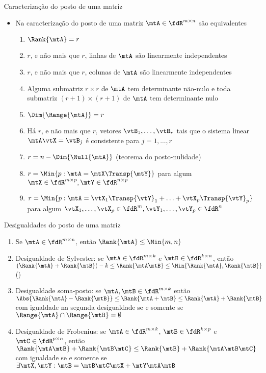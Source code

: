 \begin{frame}{Caracterização do posto de uma matriz~\cite{Horn2012}}
  \begin{itemize}
    \item Na caracterização do posto de uma matriz $ \mtA \in \fdR^{m \times n} $ são equivalentes
    \begin{enumerate}\addtolength{\itemsep}{0.5\baselineskip}
      \item $ \Rank{\mtA} = r $
      \item $ r $, e não mais que $ r $, linhas de $ \mtA $ são linearmente independentes
      \item $ r $, e não mais que $ r $, colunas de $ \mtA $ são linearmente independentes
      \item Alguma submatriz $ r \times r $ de $ \mtA $ tem determinante não-nulo e toda submatriz $ (r+1) \times (r+1) $ de $ \mtA $ tem determinante nulo
      \item $ \Dim{\Range{ \mtA }} = r $
      \item Há $ r $, e não mais que $ r $, vetores $ \vtB_1, \ldots, \vtB_r $ tais que o sistema linear $ \mtA\vtX = \vtB_j $ é consistente para $ j = 1, \ldots, r $
      \item $ r = n - \Dim{\Null{\mtA}} $ (teorema do posto-nulidade)
      \item $ r = \Min{p : \mtA = \mtX \Transp{\mtY}} $ para algum $ \mtX \in \fdR^{m\times p}, \mtY \in \fdR^{n\times p} $
      \item $ r = \Min{p : \mtA = \vtX_1 \Transp{\vtY}_1 + \ldots + \vtX_p \Transp{\vtY}_p} $ para algum $ \vtX_1, \ldots, \vtX_p \in \fdR^m, \vtY_1, \ldots, \vtY_p \in \fdR^n $
    \end{enumerate}
  \end{itemize}
\end{frame}

\begin{frame}{Desigualdades do posto de uma matriz~\cite{Horn2012}}
  \begin{enumerate}\addtolength{\itemsep}{\baselineskip}
    \item Se $ \mtA \in \fdR^{m\times n} $, então $ \Rank{\mtA} \leq \Min{m, n} $
    \item Desigualdade de Sylvester: se $ \mtA \in \fdR^{m \times k} $ e $ \mtB \in \fdR^{k \times n} $, então $ (\Rank{\mtA} + \Rank{\mtB}) - k \leq \Rank{\mtA \mtB} \leq \Min{\Rank{\mtA}, \Rank{\mtB}} $ ()
    \item Desigualdade soma-posto: se $ \mtA, \mtB \in \fdR^{m \times k} $ então $\Abs{\Rank{\mtA}-\Rank{\mtB}} \leq \Rank{\mtA + \mtB} \leq \Rank{\mtA} + \Rank{\mtB} $ com igualdade na segunda desigualdade se e somente se $ \Range{\mtA} \cap \Range{\mtB} = \emptyset $
    \item Desigualdade de Frobenius: se $ \mtA \in \fdR^{m \times k} $, $ \mtB \in \fdR^{k \times p} $ e $ \mtC \in \fdR^{p \times n} $, então $ \Rank{\mtA\mtB} + \Rank{\mtB \mtC} \leq \Rank{\mtB} + \Rank{\mtA \mtB \mtC} $ com igualdade se e somente se $ \exists \mtX, \mtY : \mtB= \mtB \mtC \mtX + \mtY \mtA \mtB $
  \end{enumerate}
\end{frame}

